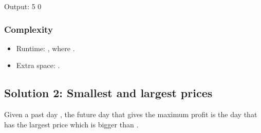 \documentclass[letterpaper,12pt,english]{book}
\begin{document}
\begin{sphinxVerbatim}[commandchars=\\\{\}]
\end{sphinxVerbatim}

\begin{sphinxVerbatim}[commandchars=\\\{\}]
Output:
5
0
\end{sphinxVerbatim}


\subsubsection{Complexity}
\label{\detokenize{Mathematics/09_MTH_121_Best_Time_to_Buy_and_Sell_Stock:complexity}}\begin{itemize}
\item {} 
\sphinxAtStartPar
Runtime: , where .

\item {} 
\sphinxAtStartPar
Extra space: .

\end{itemize}


\subsection{Solution 2: Smallest and largest prices}
\label{\detokenize{Mathematics/09_MTH_121_Best_Time_to_Buy_and_Sell_Stock:solution-2-smallest-and-largest-prices}}
\sphinxAtStartPar
Given a past day , the future day  that gives the maximum profit is the day that has the largest price which is bigger than .
\end{document}
